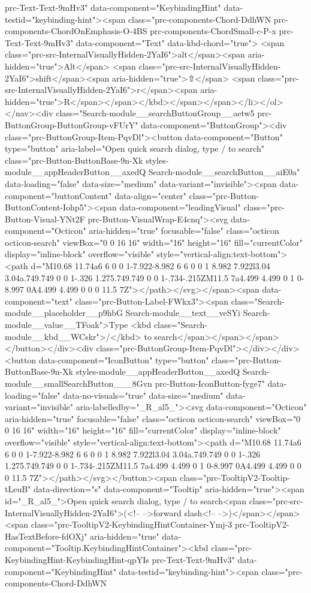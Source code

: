 {{{prc-Text-Text-9mHv3" data-component="KeybindingHint" data-testid="keybinding-hint"><span class="prc-components-Chord-DdhWN prc-components-ChordOnEmphasis-O-4BS prc-components-ChordSmall-c-P-x prc-Text-Text-9mHv3" data-component="Text" data-kbd-chord="true"> <span class="prc-src-InternalVisuallyHidden-2YaI6">alt</span><span aria-hidden="true">Alt</span> <span class="prc-src-InternalVisuallyHidden-2YaI6">shift</span><span aria-hidden="true">⇧</span> <span class="prc-src-InternalVisuallyHidden-2YaI6">r</span><span aria-hidden="true">R</span></span></kbd></span></span></li></ol></nav><div class="Search-module__searchButtonGroup__aetw5 prc-ButtonGroup-ButtonGroup-vFUrY" data-component="ButtonGroup"><div class="prc-ButtonGroup-Item-PqvDl"><button data-component="Button" type="button" aria-label="Open quick search dialog, type / to search" class="prc-Button-ButtonBase-9n-Xk styles-module__appHeaderButton__axedQ Search-module__searchButton__aiE0a" data-loading="false" data-size="medium" data-variant="invisible"><span data-component="buttonContent" data-align="center" class="prc-Button-ButtonContent-Iohp5"><span data-component="leadingVisual" class="prc-Button-Visual-YNt2F prc-Button-VisualWrap-E4cnq"><svg data-component="Octicon" aria-hidden="true" focusable="false" class="octicon octicon-search" viewBox="0 0 16 16" width="16" height="16" fill="currentColor" display="inline-block" overflow="visible" style="vertical-align:text-bottom"><path d="M10.68 11.74a6 6 0 0 1-7.922-8.982 6 6 0 0 1 8.982 7.922l3.04 3.04a.749.749 0 0 1-.326 1.275.749.749 0 0 1-.734-.215ZM11.5 7a4.499 4.499 0 1 0-8.997 0A4.499 4.499 0 0 0 11.5 7Z"></path></svg></span><span data-component="text" class="prc-Button-Label-FWkx3"><span class="Search-module__placeholder__p9hbG Search-module__text__veSYi Search-module__value__TFoak">Type <kbd class="Search-module__kbd__WCskr">/</kbd> to search</span></span></span></button></div><div class="prc-ButtonGroup-Item-PqvDl"></div></div><button data-component="IconButton" type="button" class="prc-Button-ButtonBase-9n-Xk styles-module__appHeaderButton__axedQ Search-module__smallSearchButton___8Gvn prc-Button-IconButton-fyge7" data-loading="false" data-no-visuals="true" data-size="medium" data-variant="invisible" aria-labelledby="_R_al5_"><svg data-component="Octicon" aria-hidden="true" focusable="false" class="octicon octicon-search" viewBox="0 0 16 16" width="16" height="16" fill="currentColor" display="inline-block" overflow="visible" style="vertical-align:text-bottom"><path d="M10.68 11.74a6 6 0 0 1-7.922-8.982 6 6 0 0 1 8.982 7.922l3.04 3.04a.749.749 0 0 1-.326 1.275.749.749 0 0 1-.734-.215ZM11.5 7a4.499 4.499 0 1 0-8.997 0A4.499 4.499 0 0 0 11.5 7Z"></path></svg></button><span class="prc-TooltipV2-Tooltip-tLeuB" data-direction="s" data-component="Tooltip" aria-hidden="true"><span id="_R_al5_">Open quick search dialog, type / to search<span class="prc-src-InternalVisuallyHidden-2YaI6">(<!-- -->forward slash<!-- -->)</span></span><span class="prc-TooltipV2-KeybindingHintContainer-Ymj-3 prc-TooltipV2-HasTextBefore-fdOXj" aria-hidden="true" data-component="Tooltip.KeybindingHintContainer"><kbd class="prc-KeybindingHint-KeybindingHint-qpYIs prc-Text-Text-9mHv3" data-component="KeybindingHint" data-testid="keybinding-hint"><span class="prc-components-Chord-DdhWN }}}
